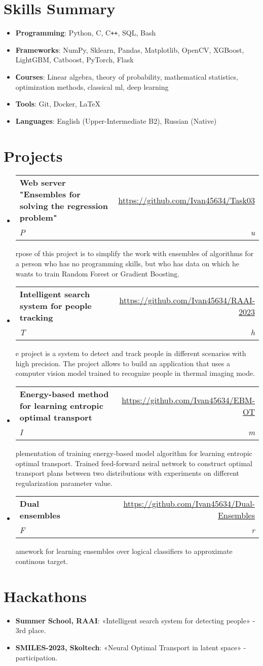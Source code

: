 \documentclass[letterpaper,10.8pt]{article}
\makeatletter
\newcommand{\resumeItem}[2]{
  \item\small{
    \textbf{#1}{: #2 \vspace{-2pt}}
  }
}
\newcommand{\resumeSubheading}[4]{
  \vspace{-1pt}\item
    \begin{tabular*}{0.97\textwidth}{l@{\extracolsep{\fill}}r}
      \textbf{#1} & #2 \\
      \textit{\small#3} & \textit{\small #4} \\
    \end{tabular*}\vspace{-5pt}
}
\newcommand{\resumeSubItem}[2]{\resumeItem{#1}{#2}\vspace{-4pt}}
\newcommand{\resumeSubHeadingListStart}{\begin{itemize}[leftmargin=*]}
\newcommand{\resumeSubHeadingListEnd}{\end{itemize}}
\makeatother
\begin{document}
\section{Skills Summary}
	\resumeSubHeadingListStart
	\resumeSubItem{Programming}{Python, C, C\texttt{++}, SQL, Bash}
	\resumeSubItem{Frameworks}{NumPy, Sklearn, Pandas, Matplotlib, OpenCV, XGBoost, LightGBM, Catboost, PyTorch, Flask}
    \resumeSubItem{Сourses}{Linear algebra, theory of probability, mathematical statistics, optimization methods, classical ml, deep learning}
    \resumeSubItem{Tools}{Git, Docker, \LaTeX}
    \resumeSubItem{Languages}{English (Upper-Intermediate B2), Russian (Native)}
\resumeSubHeadingListEnd

\section{Projects}

\resumeSubHeadingListStart
    \resumeSubheading
      {Web server "Ensembles for solving the regression problem"}{\href{https://github.com/Ivan45634/Task03}{ https://github.com/Ivan45634/Task03}}
            Purpose of this project is to simplify the work with ensembles of algorithms for a person who has no programming skills, but who has data on which he wants to train Random Forest or Gradient Boosting.

     \resumeSubheading
     {Intelligent search system for people tracking}{\href{https://github.com/Ivan45634/RAAI_project-2023}{ https://github.com/Ivan45634/RAAI-2023}}
            The project is a system to detect and track people in different scenarios with high precision. The project allows to build an application that uses a computer vision model trained to recognize people in thermal imaging mode.


    \resumeSubheading
    {Energy-based method for learning entropic optimal transport}{\href{https://github.com/Ivan45634/EBM-OT}{https://github.com/Ivan45634/EBM-OT}}
        Implementation of training energy-based model algorithm for learning entropic optimal transport. 
        Trained feed-forward neiral network to construct optimal transport plans between two distributions with experiments on different regularization parameter value.

    \resumeSubheading
    {Dual ensembles}{\href{https://github.com/Ivan45634/Dual-Ensembles}{https://github.com/Ivan45634/Dual-Ensembles}}
            Framework for learning ensembles over logical classifiers to approximate continous target.
    
\resumeSubHeadingListEnd

\section{Hackathons}
\resumeSubHeadingListStart
\resumeSubItem{Summer School, RAAI}{«Intelligent search system for detecting people» - 3rd place.}\\
\resumeSubItem{SMILES-2023, Skoltech}{«Neural Optimal Transport in latent space» - participation.}
\resumeSubHeadingListEnd

\end{document}
